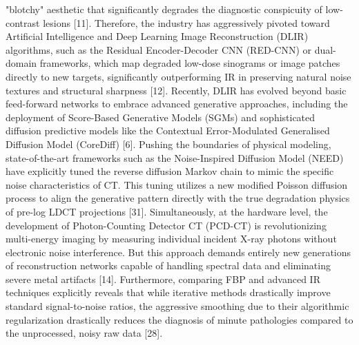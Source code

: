 "blotchy" aesthetic that significantly degrades the diagnostic conspicuity of low-contrast lesions [11]. Therefore, the industry has aggressively pivoted toward Artificial Intelligence and Deep Learning Image Reconstruction (DLIR) algorithms, such as the Residual Encoder-Decoder CNN (RED-CNN) or dual-domain frameworks, which map degraded low-dose sinograms or image patches directly to new targets, significantly outperforming IR in preserving natural noise textures and structural sharpness [12]. Recently, DLIR has evolved beyond basic feed-forward networks to embrace advanced generative approaches, including the deployment of Score-Based Generative Models (SGMs) and sophisticated diffusion predictive models like the Contextual Error-Modulated Generalised Diffusion Model (CoreDiff) [6]. Pushing the boundaries of physical modeling, state-of-the-art frameworks such as the Noise-Inspired Diffusion Model (NEED) have explicitly tuned the reverse diffusion Markov chain to mimic the specific noise characteristics of CT. This tuning utilizes a new modified Poisson diffusion process to align the generative pattern directly with the true degradation physics of pre-log LDCT projections [31]. Simultaneously, at the hardware level, the development of Photon-Counting Detector CT (PCD-CT) is revolutionizing multi-energy imaging by measuring individual incident X-ray photons without electronic noise interference. But this approach demands entirely new generations of reconstruction networks capable of handling spectral data and eliminating severe metal artifacts [14]. Furthermore, comparing FBP and advanced IR techniques explicitly reveals that while iterative methods drastically improve standard signal-to-noise ratios, the aggressive smoothing due to their algorithmic regularization drastically reduces the diagnosis of minute pathologies compared to the unprocessed, noisy raw data [28].
